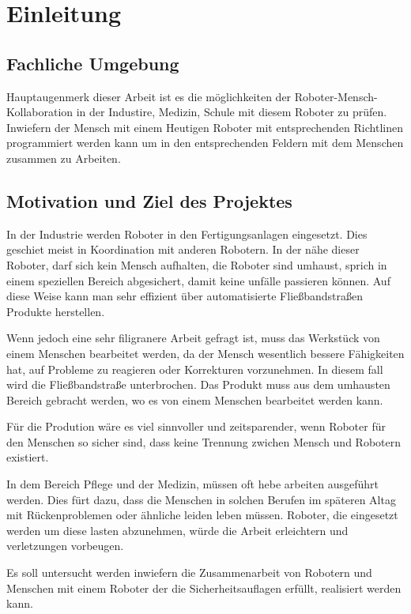 \chapter{Einleitung}
\label{einleitung}

\section{Fachliche Umgebung}
\label{fachliche_domaene}

Hauptaugenmerk dieser Arbeit ist es die möglichkeiten der Roboter-Mensch-Kollaboration
in der Industire, Medizin, Schule mit diesem Roboter zu prüfen.
Inwiefern der Mensch mit einem Heutigen Roboter mit entsprechenden Richtlinen programmiert werden kann um in den entsprechenden Feldern mit dem Menschen zusammen zu Arbeiten.

\section{Motivation und Ziel des Projektes}
\label{projektziel_motivation}

In der Industrie werden Roboter in den Fertigungsanlagen eingesetzt. 
Dies geschiet meist in Koordination mit anderen Robotern. In der nähe dieser Roboter, darf sich kein Mensch aufhalten, die Roboter sind umhaust, sprich in einem speziellen Bereich abgesichert, damit keine unfälle passieren können. 
Auf diese Weise kann man sehr effizient über automatisierte Fließbandstraßen Produkte herstellen.

Wenn jedoch eine sehr filigranere Arbeit gefragt ist, muss das Werkstück von einem Menschen bearbeitet werden, da der Mensch wesentlich bessere Fähigkeiten hat, auf Probleme zu reagieren oder Korrekturen vorzunehmen. In diesem fall wird die Fließbandstraße unterbrochen. Das Produkt muss aus dem umhausten Bereich gebracht werden, wo es von einem Menschen bearbeitet werden kann.

Für die Prodution wäre es viel sinnvoller und zeitsparender, wenn Roboter für den Menschen so sicher sind, dass keine Trennung zwichen Mensch und Robotern existiert.

In dem Bereich Pflege und der Medizin, müssen oft hebe arbeiten ausgeführt werden. Dies fürt dazu, dass die Menschen in solchen Berufen im späteren Altag mit Rückenproblemen oder ähnliche leiden leben müssen. Roboter, die eingesetzt werden um diese lasten abzunehmen, würde die Arbeit erleichtern und verletzungen vorbeugen.

Es soll untersucht werden inwiefern die Zusammenarbeit von Robotern und Menschen mit einem Roboter der die Sicherheitsauflagen erfüllt, realisiert werden kann.

